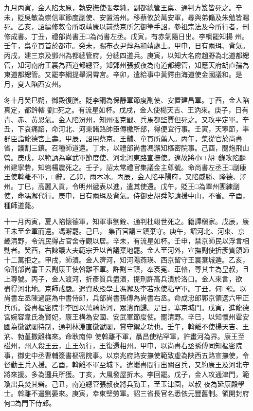 \begin{pinyinscope}
 九月丙寅，金人陷太原，執安撫使張孝純，副都總管王稟、通判方笈皆死之。辛未，貶吳敏為崇信軍節度副使、安置涪州。移蔡攸於萬安軍，尋與弟翛及朱勉皆賜死。乙亥，詔編修敕令所取靖康以前蔡京所乞御筆手詔，參祖宗法及今所行者，刪修成書。丁丑，禮部尚書王□為尚書左丞。戊寅，有赤氣隨日出。李綱罷知揚
 州。壬午，梟童貫首於都市。癸未，賜布衣尹焞為和靖處士。甲申，日有兩珥、背氣。丙戌，建三京及鄧州為都總管府，分總四道兵。庚寅，以知大名府趙野為北道都總管，知河南府王襄為西道都總管，知鄧州張叔夜為南道都總管，知應天府胡直孺為東道都總管。又罷李綱提舉洞霄宮。辛卯，遣給事中黃鍔由海道使金國議和。是月，夏人陷西安州。



 冬十月癸巳朔，御殿復膳。貶李鋼為保靜軍節度副使、安置建昌軍。丁酉，金人陷真定，都鈐轄
 劉□死之。有流星如杯。戊戌，金人使楊天吉、王汭來。庚子，日有青、赤、黃恩氣。金人陷汾州，知州張克戩、兵馬都監賈但死之。又攻平定軍。辛丑，下哀痛詔，命河北、河東諸路帥臣傳檄所部，得便宜行事。壬寅，天寧節，率群臣詣龍德宮上壽。甲辰，詔用蔡京、王黼、童貫所薦人。丙午，集從官於尚書省，議割三鎮。召種師道還。丁未，以禮部尚書馮澥知樞密院事。己酉，閱炮飛山營。庚戌，以範訥為寧武軍節度使、河北河東路宣撫使。遼故將小□
 胡□錄攻陷麟州建寧砦，知砦楊震死之。壬子，詔太常禮官集議金主尊號。命尚書左丞王□副康王使斡離不軍，□辭。乙卯，雨木冰。丙辰，金人陷平陽府，又陷威勝、隆德、澤州。丁巳，高麗入貢，令明州遞表以進，遣其使還。戊午，貶王□為單州團練副使，命馮澥代行。庚申，日有兩珥及背氣。侍御史胡舜陟請援中山，不省。辛酉，種師道薨。



 十一月丙寅，夏人陷懷德軍，知軍事劉銓、通判杜翊世死之。籍譚稹家。戊辰，康王未至金軍而還。馮澥罷。己巳，
 集百官議三鎮棄守。庚午，詔河北、河東、京畿清野，令流民得占官舍寺觀以居。辛未，有流星如杯。壬申，禁京師民以浮言相動者。癸酉，右諫議大夫範宗尹以首議棄地罷。金人至河外，宣撫副使折彥質領師十二萬拒之。甲戌，師潰。金人濟河，知河陽燕瑛、西京留守王襄棄城遁。乙亥，命刑部尚書王云副康王使斡離不軍。許割三鎮，奉袞冕、車輅，尊其主為皇叔，且上尊號。丙子，金人渡河，折彥質兵盡潰，提刑許高兵潰於洛口。金人來言，欲
 盡得河北地。京師戒嚴。遣資政殿學士馮澥及李若水使粘罕軍。丁丑，何□罷。以尚書左丞陳過庭為中書侍郎，兵部尚書孫傅為尚書右丞。命成忠郎郭京領選六甲正兵所。簽書樞密院事李回以萬騎防河，眾潰而歸。是日，塞京城門。戊寅，進龍德宮婉容韋氏為賢妃，康王構為安國、安武軍節度使。罷清野。辛巳，以知懷州霍安國為徽猷閣待制，通判林淵直徽猷閣，賞守禦之功也。壬午，斡離不使楊天吉、王汭、勃堇撒離梅來。命耿南仲
 使斡離不軍，聶昌使粘罕軍，許畫河為界。康王至磁州，州人殺王云，止王勿行，王復還相州。甲申，以尚書右丞孫傅同知樞密院事，御史中丞曹輔簽書樞密院事。以京兆府路安撫使範致虛為陜西五路宣撫使，令督勤王兵入援。乙酉，斡離不軍至城下。遣蠟書間行出關召兵，又約康王及河北守將來援。多為邏兵所獲。丁亥，大風發屋折木。李回罷。戊子，金人攻通津門，範瓊出兵焚其砦。己丑，南道總管張叔夜將兵勤王，至玉津園，以叔
 夜為延康殿學士。斡離不遣劉晏來。庚寅，幸東壁勞軍。詔三省長官名悉依元豐舊制。領開封府何□為門下侍郎。




\end{pinyinscope}
